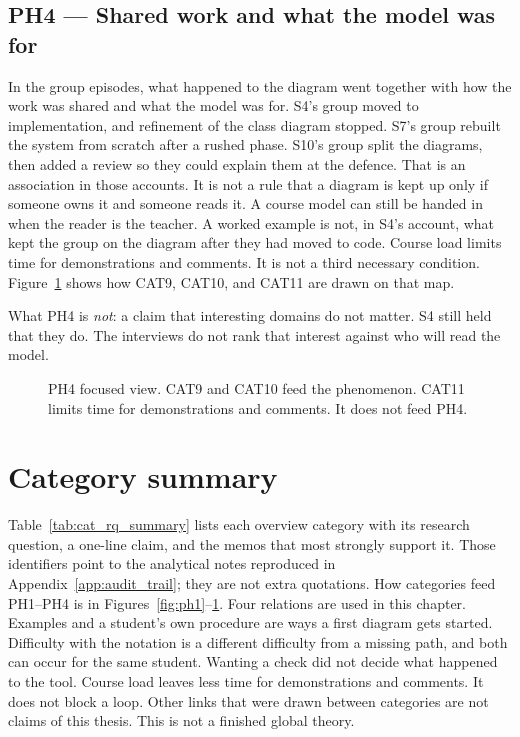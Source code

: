 \subsection{PH4 --- Shared work and what the model was for}
\label{sec:ph4}

In the group episodes, what happened to the diagram went together with how the work was shared and what the model was for. S4's group moved to implementation, and refinement of the class diagram stopped. S7's group rebuilt the system from scratch after a rushed phase. S10's group split the diagrams, then added a review so they could explain them at the defence. That is an association in those accounts. It is not a rule that a diagram is kept up only if someone owns it and someone reads it. A course model can still be handed in when the reader is the teacher. A worked example is not, in S4's account, what kept the group on the diagram after they had moved to code. Course load limits time for demonstrations and comments. It is not a third necessary condition. Figure~\ref{fig:ph4} shows how CAT9, CAT10, and CAT11 are drawn on that map.

What PH4 is \emph{not}: a claim that interesting domains do not matter. S4 still held that they do. The interviews do not rank that interest against who will read the model.

\begin{figure}[htbp]
\centering

\caption{PH4 focused view. CAT9 and CAT10 feed the phenomenon. CAT11 limits time for demonstrations and comments. It does not feed PH4.}
\label{fig:ph4}
\end{figure}

\section{Category summary}
\label{sec:findings_summary}

Table~\ref{tab:cat_rq_summary} lists each overview category with its research question, a one-line claim, and the memos that most strongly support it. Those identifiers point to the analytical notes reproduced in Appendix~\ref{app:audit_trail}; they are not extra quotations. How categories feed PH1--PH4 is in Figures~\ref{fig:ph1}--\ref{fig:ph4}. Four relations are used in this chapter. Examples and a student's own procedure are ways a first diagram gets started. Difficulty with the notation is a different difficulty from a missing path, and both can occur for the same student. Wanting a check did not decide what happened to the tool. Course load leaves less time for demonstrations and comments. It does not block a loop. Other links that were drawn between categories are not claims of this thesis. This is not a finished global theory.

